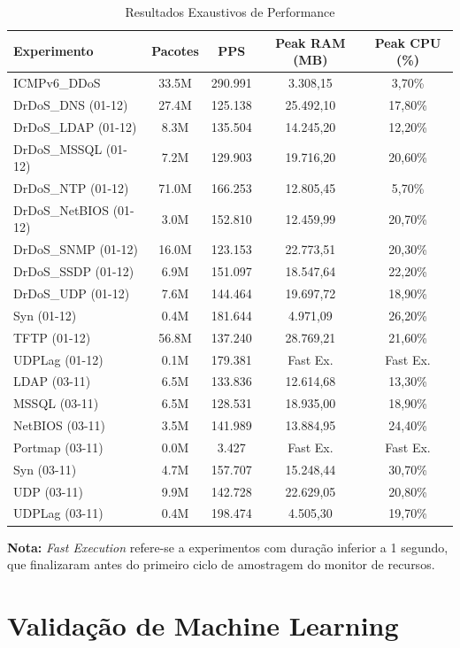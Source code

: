 \documentclass[12pt,a4paper]{article}
\begin{document}
\begin{center}
\footnotesize
\begin{longtable}{l c c c c}
\caption{Resultados Exaustivos de Performance} \\
\toprule
Experimento & Pacotes & PPS & Peak RAM (MB) & Peak CPU (\%) \\
\midrule
ICMPv6\_DDoS & 33.5M & 290.991 & 3.308,15 & 3,70\% \\
DrDoS\_DNS (01-12) & 27.4M & 125.138 & 25.492,10 & 17,80\% \\
DrDoS\_LDAP (01-12) & 8.3M & 135.504 & 14.245,20 & 12,20\% \\
DrDoS\_MSSQL (01-12) & 7.2M & 129.903 & 19.716,20 & 20,60\% \\
DrDoS\_NTP (01-12) & 71.0M & 166.253 & 12.805,45 & 5,70\% \\
DrDoS\_NetBIOS (01-12) & 3.0M & 152.810 & 12.459,99 & 20,70\% \\
DrDoS\_SNMP (01-12) & 16.0M & 123.153 & 22.773,51 & 20,30\% \\
DrDoS\_SSDP (01-12) & 6.9M & 151.097 & 18.547,64 & 22,20\% \\
DrDoS\_UDP (01-12) & 7.6M & 144.464 & 19.697,72 & 18,90\% \\
Syn (01-12) & 0.4M & 181.644 & 4.971,09 & 26,20\% \\
TFTP (01-12) & 56.8M & 137.240 & 28.769,21 & 21,60\% \\
UDPLag (01-12) & 0.1M & 179.381 & Fast Ex. & Fast Ex. \\
LDAP (03-11) & 6.5M & 133.836 & 12.614,68 & 13,30\% \\
MSSQL (03-11) & 6.5M & 128.531 & 18.935,00 & 18,90\% \\
NetBIOS (03-11) & 3.5M & 141.989 & 13.884,95 & 24,40\% \\
Portmap (03-11) & 0.0M & 3.427 & Fast Ex. & Fast Ex. \\
Syn (03-11) & 4.7M & 157.707 & 15.248,44 & 30,70\% \\
UDP (03-11) & 9.9M & 142.728 & 22.629,05 & 20,80\% \\
UDPLag (03-11) & 0.4M & 198.474 & 4.505,30 & 19,70\% \\
\bottomrule
\end{longtable}
\footnotesize \textbf{Nota:} \textit{Fast Execution} refere-se a experimentos com dura\c{c}\~{a}o inferior a 1 segundo, que finalizaram antes do primeiro ciclo de amostragem do monitor de recursos.
\end{center}

\section{Valida\c{c}\~{a}o de Machine Learning}
\end{document}
